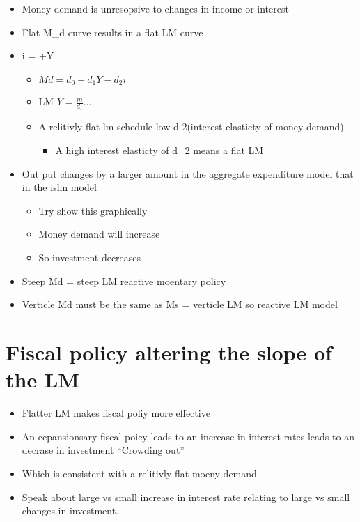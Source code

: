 \documentclass[twocolumn]{article}
\providecommand{\tightlist}{%
  \setlength{\itemsep}{0pt}\setlength{\parskip}{0pt}}
\begin{document}
\begin{itemize}
\tightlist
\item
  Money demand is unresopsive to changes in income or interest
\item
  Flat M\_d curve results in a flat LM curve
\item
  i = +Y

  \begin{itemize}
  \tightlist
  \item
    \(Md = d_0 + d_1Y -d_2i\)
  \item
    LM \(Y = \frac{m}{d_1} ...\)
  \item
    A relitivly flat lm schedule low d-2(interest elasticty of money
    demand)

    \begin{itemize}
    \tightlist
    \item
      A high interest elasticty of d\_2 means a flat LM
    \end{itemize}
  \end{itemize}
\item
  Out put changes by a larger amount in the aggregate expenditure model
  that in the islm model

  \begin{itemize}
  \tightlist
  \item
    Try show this graphically
  \item
    Money demand will increase
  \item
    So investment decreases
  \end{itemize}
\item
  Steep Md = steep LM reactive moentary policy
\item
  Verticle Md must be the same as Ms = verticle LM so reactive LM model
\end{itemize}

\hypertarget{fiscal-policy-altering-the-slope-of-the-lm}{%
\section{Fiscal policy altering the slope of the
LM}\label{fiscal-policy-altering-the-slope-of-the-lm}}

\begin{itemize}
\tightlist
\item
  Flatter LM makes fiscal poliy more effective
\item
  An ecpansionsary fiscal poicy leads to an increase in interest rates
  leads to an decrase in investment ``Crowding out''
\item
  Which is consistent with a relitivly flat moeny demand
\item
  Speak about large vs small increase in interest rate relating to large
  vs small changes in investment.
\end{itemize}
\end{document}
